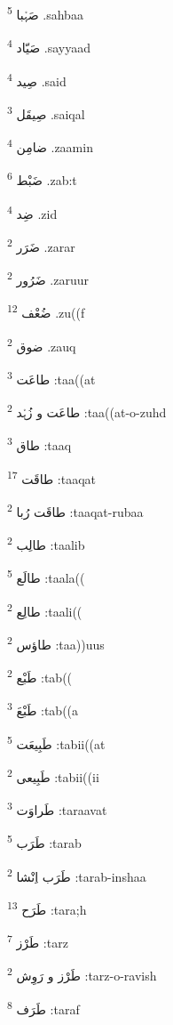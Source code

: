 \documentclass[12pt]{article}
\begin{document}
\begin{RTL}
\begin{multicols}{5}
{\ur صَہْبا}   \textsuperscript{5} .sahbaa

{\ur صَیّاد}   \textsuperscript{4} .sayyaad

{\ur صِید}   \textsuperscript{4} .said

{\ur صِیقَل}   \textsuperscript{3} .saiqal

{\ur ضامِن}   \textsuperscript{4} .zaamin

{\ur ضَبْط}   \textsuperscript{6} .zab:t

{\ur ضِد}   \textsuperscript{4} .zid

{\ur ضَرَر}   \textsuperscript{2} .zarar

{\ur ضَرُور}   \textsuperscript{2} .zaruur

{\ur ضُعْف}   \textsuperscript{12} .zu((f

{\ur ضوق}   \textsuperscript{2} .zauq

{\ur طاعَت}   \textsuperscript{3} :taa((at

{\ur طاعَت و زُہْد}   \textsuperscript{2} :taa((at-o-zuhd

{\ur طاق}   \textsuperscript{3} :taaq

{\ur طاقَت}   \textsuperscript{17} :taaqat

{\ur طاقَت رُبا}   \textsuperscript{2} :taaqat-rubaa

{\ur طالِب}   \textsuperscript{2} :taalib

{\ur طالَع}   \textsuperscript{5} :taala((

{\ur طالِع}   \textsuperscript{2} :taali((

{\ur طاؤس}   \textsuperscript{2} :taa))uus

{\ur طَبْع}   \textsuperscript{2} :tab((

{\ur طَبْعَ}   \textsuperscript{3} :tab((a

{\ur طَبِیعَت}   \textsuperscript{5} :tabii((at

{\ur طَبِیعی}   \textsuperscript{2} :tabii((ii

{\ur طَراوَت}   \textsuperscript{3} :taraavat

{\ur طَرَب}   \textsuperscript{5} :tarab

{\ur طَرَب اِنْشا}   \textsuperscript{2} :tarab-inshaa

{\ur طَرَح}   \textsuperscript{13} :tara;h

{\ur طَرْز}   \textsuperscript{7} :tarz

{\ur طَرْز و رَوِش}   \textsuperscript{2} :tarz-o-ravish

{\ur طَرَف}   \textsuperscript{8} :taraf


\end{multicols}
\end{RTL}
\end{document}
